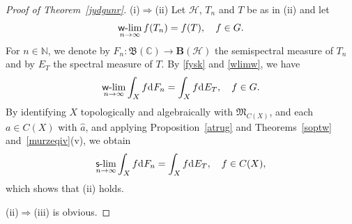 \documentclass[reqno]{amsproc}
\numberwithin{equation}{section}
\theoremstyle{remark}
\newcommand*{\hh}{\mathcal{H}}
\newcommand*{\natu}{\mathbb{N}}
\newcommand*{\comp}{\mathbb{C}}
\newcommand*{\borel}{\mathfrak{B}}
\newcommand*{\cbb}{\comp}
\newcommand*{\D}{\mathrm{d\hspace{.1ex}}}
\theoremstyle{definition}
\newcommand*{\ogr}{\boldsymbol{B}}
\def\sslim{\qopname\relax m{{\sf{s}\textrm-}lim}}
\def\wwlim{\qopname\relax m{{\sf{w}\textrm-}lim}}
\begin{document}
   \begin{proof}[Proof of Theorem~\ref{jydgunr}]
(i)$\Rightarrow$(ii) Let $\hh$, $T_n$ and $T$ be as in
(ii) and let
   \begin{align} \label{wlimw}
\wwlim_{n\to \infty} f(T_n) = f(T), \quad f\in G.
   \end{align}
For $n\in \natu$, we denote by $F_n\colon \borel(\cbb)
\to \ogr(\hh)$ the semispectral measure of $T_n$ and
by $E_{T}$ the spectral measure of $T$. By
\eqref{fysk} and \eqref{wlimw}, we have
 \begin{equation*}
\wwlim_{n\to \infty}\int_{X} f \D F_n = \int_{X} f \D
E_{T},\quad f\in G.
   \end{equation*}
By identifying $X$ topologically and algebraically
with $\mathfrak{M}_{C(X)}$, and each $a \in C(X)$ with
$\hat a$, and applying Proposition~\ref{atrug} and
Theorems~\ref{soptw} and~\ref{murzeqiv}(v), we obtain
   \begin{equation*}
\sslim_{n\to \infty}\int_{X} f \D F_n = \int_{X} f \D
E_{T},\quad f\in C(X),
   \end{equation*}
which shows that (ii) holds.

(ii)$\Rightarrow$(iii) is obvious.


\end{proof}
\end{document}
